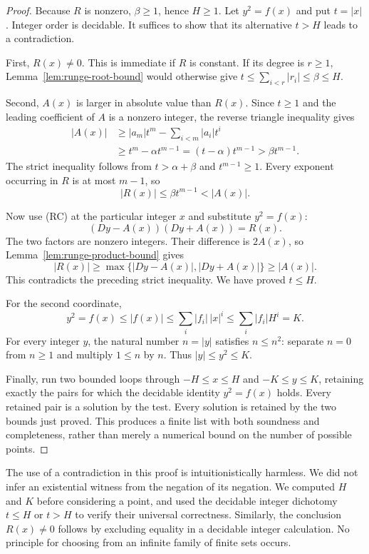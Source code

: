 \begin{proof}
Because $R$ is nonzero, $\beta\geq1$, hence $H\geq1$.
Let $y^2=f(x)$ and put $t=|x|$.  Integer order is decidable.  It suffices to
show that its alternative $t>H$ leads to a contradiction.

First, $R(x)\neq0$.  This is immediate if $R$ is constant.  If its degree is
$r\geq1$, Lemma~\ref{lem:runge-root-bound} would otherwise give
$t\leq\sum_{i<r}|r_i|\leq\beta\leq H$.

Second, $A(x)$ is larger in absolute value than $R(x)$.  Since $t\geq1$ and
the leading coefficient of $A$ is a nonzero integer, the reverse triangle
inequality gives
\begin{align*}
 |A(x)|
 &\geq |a_m|t^m-\sum_{i<m}|a_i|t^i\\
 &\geq t^m-\alpha t^{m-1}
   =(t-\alpha)t^{m-1}
   >\beta t^{m-1}.
\end{align*}
The strict inequality follows from $t>\alpha+\beta$ and
$t^{m-1}\geq1$.  Every exponent occurring in $R$ is at most $m-1$, so
\[
                  |R(x)|\leq\beta t^{m-1}<|A(x)|.
\]

Now use (RC) at the particular integer $x$ and substitute $y^2=f(x)$:
\[
              (Dy-A(x))(Dy+A(x))=R(x).
\]
The two factors are nonzero integers.  Their difference is $2A(x)$, so
Lemma~\ref{lem:runge-product-bound} gives
\[
 |R(x)|\geq
 \max\{|Dy-A(x)|,|Dy+A(x)|\}\geq |A(x)|.
\]
This contradicts the preceding strict inequality.  We have proved $t\leq H$.

For the second coordinate,
\[
 y^2=f(x)\leq |f(x)|\leq\sum_i|f_i|\,|x|^i
                         \leq\sum_i|f_i|H^i=K.
\]
For every integer $y$, the natural number $n=|y|$ satisfies $n\leq n^2$:
separate $n=0$ from $n\geq1$ and multiply $1\leq n$ by $n$.
Thus $|y|\leq y^2\leq K$.

Finally, run two bounded loops through $-H\leq x\leq H$ and
$-K\leq y\leq K$, retaining exactly the pairs for which the decidable
identity $y^2=f(x)$ holds.  Every retained pair is a solution by the test.
Every solution is retained by the two bounds just proved.  This produces a
finite list with both soundness and completeness, rather than merely a
numerical bound on the number of possible points.
\end{proof}

The use of a contradiction in this proof is intuitionistically harmless.
We did not infer an existential witness from the negation of its negation.
We computed $H$ and $K$ before considering a point, and used the decidable
integer dichotomy $t\leq H$ or $t>H$ to verify their universal correctness.
Similarly, the conclusion $R(x)\neq0$ follows by excluding equality in a
decidable integer calculation.  No principle for choosing from an infinite
family of finite sets occurs.

